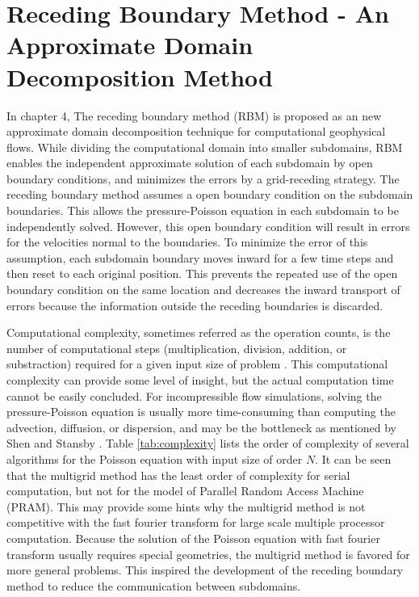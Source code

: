 \normalsize
\section{Receding Boundary Method - An Approximate Domain Decomposition Method}

In chapter 4, The receding boundary method (RBM) is proposed as an new approximate domain decomposition technique for computational geophysical flows. While dividing the computational domain into smaller subdomains, RBM enables the independent approximate solution of each subdomain by open boundary conditions, and minimizes the errors by a grid-receding strategy. The receding boundary method assumes a open boundary condition on the subdomain boundaries. This allows the pressure-Poisson equation in each subdomain to be independently solved. However, this open boundary condition will result in errors for the velocities normal to the boundaries. To minimize the error of this assumption, each subdomain boundary moves inward for a few time steps and then reset to each original position. This prevents the repeated use of the open boundary condition on the same location and decreases the inward transport of errors because the information outside the receding boundaries is discarded.

Computational complexity, sometimes referred as the operation counts, is the number of computational steps (multiplication, division, addition, or substraction) required for a given input size of problem \cite{Hartmanis1965, Papadimitriou1994}. This computational complexity can provide some level of insight, but the actual computation time cannot be easily concluded. For incompressible flow simulations, solving the pressure-Poisson equation is usually more time-consuming than computing the advection, diffusion, or dispersion, and may be the bottleneck as mentioned by Shen \cite{Shen04} and Stansby \cite{Stansby1998}. Table \ref{tab:complexity} \cite{Demmel1997} lists the order of complexity of several algorithms for the Poisson equation with input size of order $N$. It can be seen that the multigrid method has the least order of complexity for serial computation, but not for the model of Parallel Random Access Machine (PRAM). This may provide some hints why the multigrid method is not competitive with the fast fourier transform for large scale multiple processor computation. Because the solution of the Poisson equation with fast fourier transform usually requires special geometries, the multigrid method is favored for more general problems. This inspired the development of the receding boundary method to reduce the communication between subdomains.

